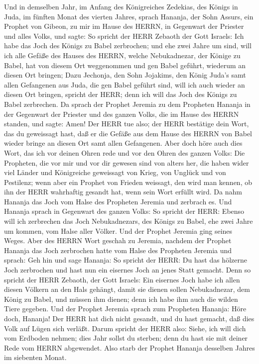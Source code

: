  Und in demselben Jahr, im Anfang des Königreiches Zedekias,
des Königs in Juda, im fünften Monat des vierten Jahres, sprach Hananja,
der Sohn Assurs, ein Prophet von Gibeon, zu mir im Hause des HERRN, in
Gegenwart der Priester und alles Volks, und sagte:  So
spricht der HERR Zebaoth der Gott Israels: Ich habe das Joch des Königs
zu Babel zerbrochen;  und ehe zwei Jahre um sind, will ich
alle Gefäße des Hauses des HERRN, welche Nebukadnezar, der Könige zu
Babel, hat von diesem Ort weggenommen und gen Babel geführt, wiederum an
diesen Ort bringen;  Dazu Jechonja, den Sohn Jojakims, den
König Juda's samt allen Gefangenen aus Juda, die gen Babel geführt sind,
will ich auch wieder an diesen Ort bringen, spricht der HERR; denn ich
will das Joch des Königs zu Babel zerbrechen.  Da sprach der
Prophet Jeremia zu dem Propheten Hananja in der Gegenwart der Priester
und des ganzen Volks, die im Hause des HERRN standen,  und
sagte: Amen! Der HERR tue also; der HERR bestätige dein Wort, das du
geweissagt hast, daß er die Gefäße aus dem Hause des HERRN von Babel
wieder bringe an diesen Ort samt allen Gefangenen.  Aber
doch höre auch dies Wort, das ich vor deinen Ohren rede und vor den
Ohren des ganzen Volks:  Die Propheten, die vor mir und vor
dir gewesen sind von alters her, die haben wider viel Länder und
Königreiche geweissagt von Krieg, von Unglück und von Pestilenz;
 wenn aber ein Prophet von Frieden weissagt, den wird man
kennen, ob ihn der HERR wahrhaftig gesandt hat, wenn sein Wort erfüllt
wird.  Da nahm Hananja das Joch vom Halse des Propheten
Jeremia und zerbrach es.  Und Hananja sprach in Gegenwart
des ganzen Volks: So spricht der HERR: Ebenso will ich zerbrechen das
Joch Nebukadnezars, des Königs zu Babel, ehe zwei Jahre um kommen, vom
Halse aller Völker. Und der Prophet Jeremia ging seines Weges.
 Aber des HERRN Wort geschah zu Jeremia, nachdem der
Prophet Hananja das Joch zerbrochen hatte vom Halse des Propheten
Jeremia und sprach:  Geh hin und sage Hananja: So spricht
der HERR: Du hast das hölzerne Joch zerbrochen und hast nun ein eisernes
Joch an jenes Statt gemacht.  Denn so spricht der HERR
Zebaoth, der Gott Israels: Ein eisernes Joch habe ich allen diesen
Völkern an den Hals gehängt, damit sie dienen sollen Nebukadnezar, dem
König zu Babel, und müssen ihm dienen; denn ich habe ihm auch die wilden
Tiere gegeben.  Und der Prophet Jeremia sprach zum
Propheten Hananja: Höre doch, Hananja! Der HERR hat dich nicht gesandt,
und du hast gemacht, daß dies Volk auf Lügen sich verläßt. 
Darum spricht der HERR also: Siehe, ich will dich vom Erdboden nehmen;
dies Jahr sollst du sterben; denn du hast sie mit deiner Rede vom HERRN
abgewendet.  Also starb der Prophet Hananja desselben
Jahres im siebenten Monat.

